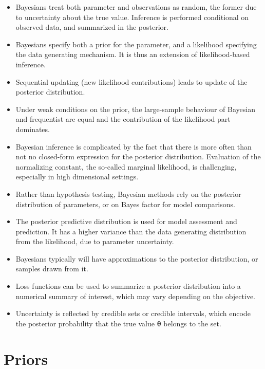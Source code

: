 \documentclass[
  11pt,
  letterpaper,
]{scrbook}
\providecommand{\tightlist}{%
  \setlength{\itemsep}{0pt}\setlength{\parskip}{0pt}}
\theoremstyle{definition}
\theoremstyle{plain}
\theoremstyle{plain}
\theoremstyle{plain}
\theoremstyle{definition}
\theoremstyle{definition}
\theoremstyle{plain}
\theoremstyle{plain}
\theoremstyle{remark}
\begin{document}
\begin{tcolorbox}
\begin{itemize}
\tightlist
\item
  Bayesians treat both parameter and observations as random, the former
  due to uncertainty about the true value. Inference is performed
  conditional on observed data, and summarized in the posterior.
\item
  Bayesians specify both a prior for the parameter, and a likelihood
  specifying the data generating mechanism. It is thus an extension of
  likelihood-based inference.
\item
  Sequential updating (new likelihood contributions) leads to update of
  the posterior distribution.
\item
  Under weak conditions on the prior, the large-sample behaviour of
  Bayesian and frequentist are equal and the contribution of the
  likelihood part dominates.
\item
  Bayesian inference is complicated by the fact that there is more often
  than not no closed-form expression for the posterior distribution.
  Evaluation of the normalizing constant, the so-called marginal
  likelihood, is challenging, especially in high dimensional settings.
\item
  Rather than hypothesis testing, Bayesian methods rely on the posterior
  distribution of parameters, or on Bayes factor for model comparisons.
\item
  The posterior predictive distribution is used for model assessment and
  prediction. It has a higher variance than the data generating
  distribution from the likelihood, due to parameter uncertainty.
\item
  Bayesians typically will have approximations to the posterior
  distribution, or samples drawn from it.
\item
  Loss functions can be used to summarize a posterior distribution into
  a numerical summary of interest, which may vary depending on the
  objective.
\item
  Uncertainty is reflected by credible sets or credible intervals, which
  encode the posterior probability that the true value
  \(\boldsymbol{\theta}\) belongs to the set.
\end{itemize}

\end{tcolorbox}


\chapter{Priors}\label{priors}
\end{document}
